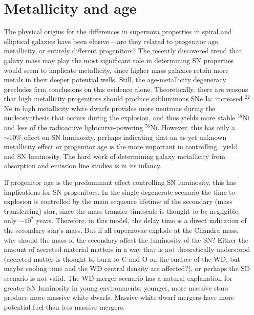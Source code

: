 \documentclass{nature1}
\begin{document}
\section{Metallicity and age}
The physical origins for the differences in supernova properties in
spiral and elliptical galaxies have been
elusive\citep{1996AJ....112.2391H,2001ApJ...554L.193H,2006ApJ...648..868S}
-- are they related to progenitor age, metallicity, or entirely
different progenitors?  The recently discovered trend that galaxy mass
may play the most significant role in determining SN
properties\citep{2009ApJ...691..661H,2010MNRAS.406..782S} would seem
to implicate metallicity, since higher mass galaxies retain more
metals in their deeper potential wells.  Still, the age-metallicity
degeneracy precludes firm conclusions on this evidence
alone\citep{2005ApJ...634..210G}.  Theoretically, there are reasons
that high metallicity progenitors should produce subluminous SNe
Ia\citep{2003ApJ...590L..83T}: increased $^{22}$Ne in high metallicity
white dwarfs provides more neutrons during the nucleosynthesis that
occurs during the explosion, and thus yields more stable $^{58}$Ni and
less of the radioactive lightcurve-powering $^{56}$Ni.  However, this
has only a $\sim 10\%$ effect on SN luminosity, perhaps indicating
that an as-yet unknown metallicity effect or progenitor age is the
more important in controlling \Ni\ yield and SN
luminosity\citep{2009ApJ...691..661H}.  The hard work of determining
galaxy metallicity from absorption and emission line studies is in its
infancy\citep{2008ApJ...685..752G,2005ApJ...634..210G}.

If progenitor age is the predominant effect controlling SN luminosity,
this has implications for SN progenitors.  In the single
degenerate scenario the time to explosion is controlled by the main
sequence lifetime of the secondary (mass transferring) star, since the
mass transfer timescale is thought to be negligible, only $\sim 10^7$
years.  Therefore, in this model, the delay time is a direct
indication of the secondary star's mass.  But if all supernovae
explode at the Chandra mass, why should the mass of the secondary
affect the luminosity of the SN\citep{2001ApJ...556..302H}?  Either
the amount of accreted material matters in a way that is not
theoretically understood (accreted matter is thought to burn to C and
O on the surface of the WD, but maybe cooling time and the WD central density are affected?), or perhaps the SD scenario is not valid.
The WD merger scenario has a natural explanation for greater SN
luminosity in young environments: younger, more massive stars produce
more massive white dwarfs.  Massive white dwarf mergers have more
potential fuel than less massive mergers.
\end{document}
